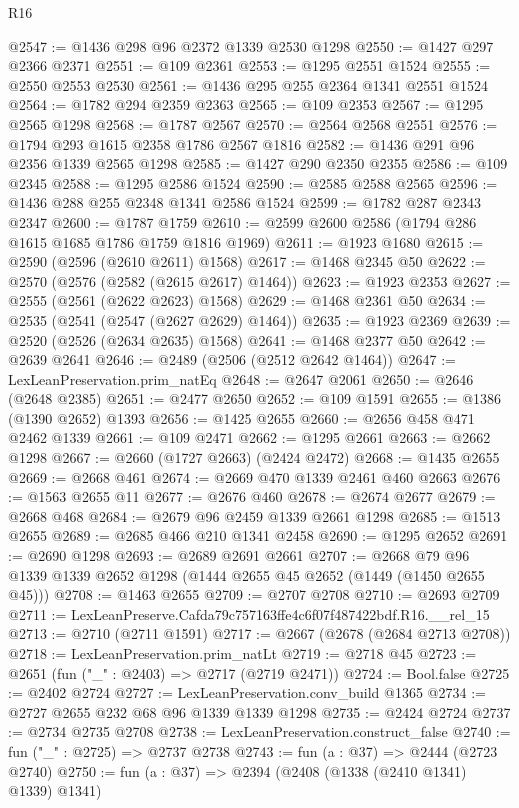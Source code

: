 \begin{lexlean}{R16}
\begin{coremodule}
@2547 := @1436 @298 @96 @2372 @1339 @2530 @1298
@2550 := @1427 @297 @2366 @2371
@2551 := @109 @2361
@2553 := @1295 @2551 @1524
@2555 := @2550 @2553 @2530
@2561 := @1436 @295 @255 @2364 @1341 @2551 @1524
@2564 := @1782 @294 @2359 @2363
@2565 := @109 @2353
@2567 := @1295 @2565 @1298
@2568 := @1787 @2567
@2570 := @2564 @2568 @2551
@2576 := @1794 @293 @1615 @2358 @1786 @2567 @1816
@2582 := @1436 @291 @96 @2356 @1339 @2565 @1298
@2585 := @1427 @290 @2350 @2355
@2586 := @109 @2345
@2588 := @1295 @2586 @1524
@2590 := @2585 @2588 @2565
@2596 := @1436 @288 @255 @2348 @1341 @2586 @1524
@2599 := @1782 @287 @2343 @2347
@2600 := @1787 @1759
@2610 := @2599 @2600 @2586 (@1794 @286 @1615 @1685 @1786 @1759 @1816 @1969)
@2611 := @1923 @1680
@2615 := @2590 (@2596 (@2610 @2611) @1568)
@2617 := @1468 @2345 @50
@2622 := @2570 (@2576 (@2582 (@2615 @2617) @1464))
@2623 := @1923 @2353
@2627 := @2555 (@2561 (@2622 @2623) @1568)
@2629 := @1468 @2361 @50
@2634 := @2535 (@2541 (@2547 (@2627 @2629) @1464))
@2635 := @1923 @2369
@2639 := @2520 (@2526 (@2634 @2635) @1568)
@2641 := @1468 @2377 @50
@2642 := @2639 @2641
@2646 := @2489 (@2506 (@2512 @2642 @1464))
@2647 := LexLeanPreservation.prim_natEq
@2648 := @2647 @2061
@2650 := @2646 (@2648 @2385)
@2651 := @2477 @2650
@2652 := @109 @1591
@2655 := @1386 (@1390 @2652) @1393
@2656 := @1425 @2655
@2660 := @2656 @458 @471 @2462 @1339
@2661 := @109 @2471
@2662 := @1295 @2661
@2663 := @2662 @1298
@2667 := @2660 (@1727 @2663) (@2424 @2472)
@2668 := @1435 @2655
@2669 := @2668 @461
@2674 := @2669 @470 @1339 @2461 @460 @2663
@2676 := @1563 @2655 @11
@2677 := @2676 @460
@2678 := @2674 @2677
@2679 := @2668 @468
@2684 := @2679 @96 @2459 @1339 @2661 @1298
@2685 := @1513 @2655
@2689 := @2685 @466 @210 @1341 @2458
@2690 := @1295 @2652
@2691 := @2690 @1298
@2693 := @2689 @2691 @2661
@2707 := @2668 @79 @96 @1339 @1339 @2652 @1298 (@1444 @2655 @45 @2652 (@1449 (@1450 @2655 @45)))
@2708 := @1463 @2655
@2709 := @2707 @2708
@2710 := @2693 @2709
@2711 := LexLeanPreserve.Cafda79c757163ffe4c6f07f487422bdf.R16.__rel_15
@2713 := @2710 (@2711 @1591)
@2717 := @2667 (@2678 (@2684 @2713 @2708))
@2718 := LexLeanPreservation.prim_natLt
@2719 := @2718 @45
@2723 := @2651 (fun ("_" : @2403) => @2717 (@2719 @2471))
@2724 := Bool.false
@2725 := @2402 @2724
@2727 := LexLeanPreservation.conv_build @1365
@2734 := @2727 @2655 @232 @68 @96 @1339 @1339 @1298
@2735 := @2424 @2724
@2737 := @2734 @2735 @2708
@2738 := LexLeanPreservation.construct_false
@2740 := fun ("_" : @2725) => @2737 @2738
@2743 := fun (a : @37) => @2444 (@2723 @2740)
@2750 := fun (a : @37) => @2394 (@2408 (@1338 (@2410 @1341) @1339) @1341)

\end{coremodule}
\end{lexlean}
